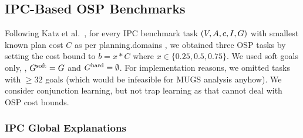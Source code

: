 \subsection{IPC-Based OSP Benchmarks}
\label{experiments:ipc}

%

Following Katz et al.\ , for every IPC
benchmark task $(V,A,{c},I,G)$ with smallest known
plan cost $C$ as per planning.domains \cite{muise:icaps-demos-16}, we
obtained three OSP tasks by setting the cost bound to $b = x * C$
where $x \in \{0.25, 0.5, 0.75\}$. We used soft goals only, \ie,
$G^{\text{\textup{soft}}} = G$ and $G^{\text{\textup{hard}}}=\emptyset$. For implementation
reasons, we omitted tasks with $\geq 32$ goals (which would be
infeasible for MUGS analysis anyhow).
%
%
%
%
We consider conjunction learning, but not trap learning as that cannot
deal with OSP cost bounds.
%


\subsubsection{IPC Global Explanations}

